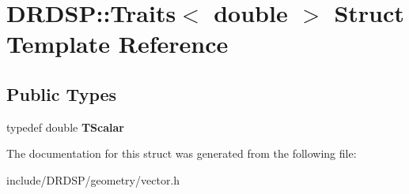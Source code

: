 \hypertarget{struct_d_r_d_s_p_1_1_traits_3_01double_01_4}{\section{D\-R\-D\-S\-P\-:\-:Traits$<$ double $>$ Struct Template Reference}
\label{struct_d_r_d_s_p_1_1_traits_3_01double_01_4}
}
\subsection*{Public Types}
\begin{DoxyCompactItemize}
\item 
\hypertarget{struct_d_r_d_s_p_1_1_traits_3_01double_01_4_a7ca4b622dcdefa389bfbae5ba70f6467}{typedef double {\bfseries T\-Scalar}}\label{struct_d_r_d_s_p_1_1_traits_3_01double_01_4_a7ca4b622dcdefa389bfbae5ba70f6467}

\end{DoxyCompactItemize}


The documentation for this struct was generated from the following file\-:\begin{DoxyCompactItemize}
\item 
include/\-D\-R\-D\-S\-P/geometry/vector.\-h\end{DoxyCompactItemize}
